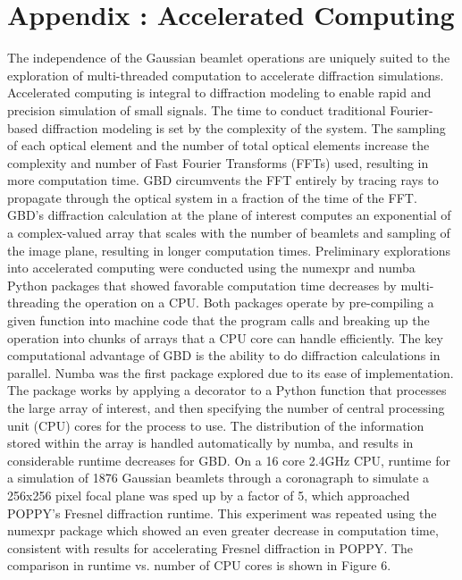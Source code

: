 \section{Appendix : Accelerated Computing}
\label{sec:appendixB}
The independence of the Gaussian beamlet operations are uniquely suited to the exploration of multi-threaded computation to accelerate diffraction simulations. Accelerated computing is integral to diffraction modeling to enable rapid and precision simulation of small signals. 
The time to conduct traditional Fourier-based diffraction modeling is set by the complexity of the system. The sampling of each optical element and the number of total optical elements increase the complexity and number of Fast Fourier Transforms (FFTs) used, resulting in more computation time. GBD circumvents the FFT entirely by tracing rays to propagate through the optical system in a fraction of the time of the FFT. GBD’s diffraction calculation at the plane of interest computes an exponential of a complex-valued array that scales with the number of beamlets and sampling of the image plane, resulting in longer computation times.  Preliminary explorations into accelerated computing were conducted using the numexpr\cite{robert_mcleod_2018_2483274} and numba\cite{lam_numba_2015} Python packages that showed favorable computation time decreases by multi-threading the operation on a CPU. Both packages operate by pre-compiling a given function into machine code that the program calls and breaking up the operation into chunks of arrays that a CPU core can handle efficiently. The key computational advantage of GBD is the ability to do diffraction calculations in parallel. Numba was the first package explored due to its ease of implementation. The package works by applying a decorator to a Python function that processes the large array of interest, and then specifying the number of central processing unit (CPU) cores for the process to use. The distribution of the information stored within the array is handled automatically by numba, and results in considerable runtime decreases for GBD. On a 16 core 2.4GHz CPU, runtime for a simulation of 1876 Gaussian beamlets through a coronagraph to simulate a 256x256 pixel focal plane was sped up by a factor of 5, which approached POPPY's Fresnel diffraction runtime. This experiment was repeated using the numexpr package which showed an even greater decrease in computation time, consistent with results for accelerating Fresnel diffraction in POPPY\cite{Doug18}. The comparison in runtime vs. number of CPU cores is shown in Figure 6.

